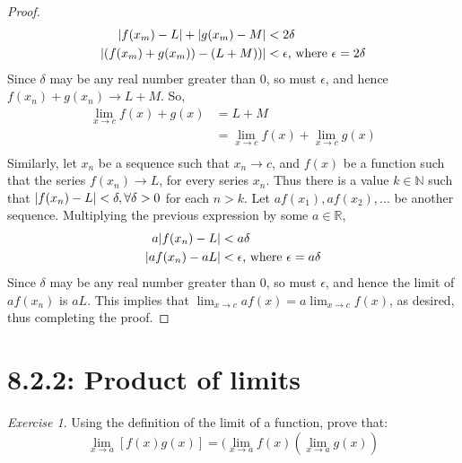 \documentclass{article}
\DeclarePairedDelimiter\abs{\lvert}{\rvert}%
\theoremstyle{remark}
\newtheorem*{exercise}{Exercise}
\begin{document}
\begin{proof}
\[
\begin{aligned}
    \abs{f(x_m)-L} + \abs{g(x_m)-M} &< 2\delta \\
    \abs{(f(x_m)+g(x_m))-(L+M))} &< \epsilon \text{, where } \epsilon = 2\delta \\
\end{aligned}
\]
Since $\delta$ may be any real number greater than 0, so must $\epsilon$, and hence
$f(x_n)+g(x_n) \rightarrow L+M$. So,
\[
\begin{aligned}
    \lim_{x \to c} f(x) + g(x) &= L+M \\
    &= \lim_{x \to c} f(x) + \lim_{x \to c} g(x) \\
\end{aligned}
\]
Similarly, let $x_n$ be a sequence such that $x_n \rightarrow c$, and
$f(x)$ be a function such that the series $f(x_n) \rightarrow L$,
for every series $x_n$. Thus there is a value $k \in \mathbb{N}$
such that $\abs{f(x_n)-L} < \delta, \forall \delta > 0$ for each
$n > k$.
Let $af(x_1), af(x_2), ...$ be another sequence. Multiplying the
previous expression by some $a \in \mathbb{R}$,
\[
\begin{aligned}
    a\abs{f(x_n)-L} &< a\delta \\
    \abs{af(x_n)-aL} &< \epsilon \text{, where } \epsilon = a\delta \\
\end{aligned}
\]
Since $\delta$ may be any real number greater than 0, so must $\epsilon$,
and hence the limit of $af(x_n)$ is $aL$. This implies that
$\lim_{x \to c} af(x) = a\lim_{x \to c} f(x)$, as desired,
thus completing the proof.

\end{proof}

\section*{8.2.2: Product of limits}
\begin{exercise}
    Using the definition of the limit of a function, prove that:
    \[
        \lim_{x \to a}[f(x)g(x)] = (\lim_{x \to a}f(x)(\lim_{x \to a} g(x))
    \]
\end{exercise}
\end{document}

